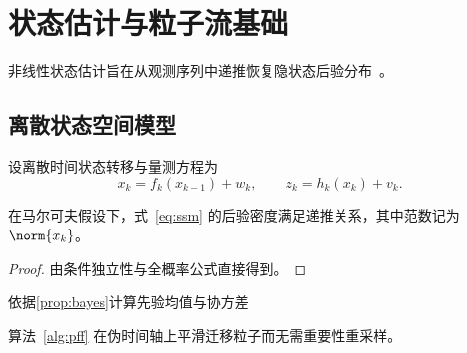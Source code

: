 \ifhit@openright\cleardoublepage\fi
\chapter{状态估计与粒子流基础}\label{sec:intro}

非线性状态估计旨在从观测序列中递推恢复隐状态后验分布~\cite{kalman1960,daum2010}。

\section{离散状态空间模型}\label{sec:ssm}

设离散时间状态转移与量测方程为
\begin{equation}\label{eq:ssm}
x_k = f_k(x_{k-1}) + w_k, \qquad z_k = h_k(x_k) + v_k.
\end{equation}

\begin{proposition}[预测-更新分解]\label{prop:bayes}
在马尔可夫假设下，式~\eqref{eq:ssm} 的后验密度满足递推关系，其中范数记为 $\norm{x_k}$。
\end{proposition}
\begin{proof}
由条件独立性与全概率公式直接得到。
\end{proof}

\begin{algorithm}[htbp]
\caption{单步同伦粒子流更新}\label{alg:pff}
依据\ref{prop:bayes}计算先验均值与协方差\;
\;
\end{algorithm}

算法~\ref{alg:pff} 在伪时间轴上平滑迁移粒子而无需重要性重采样。
